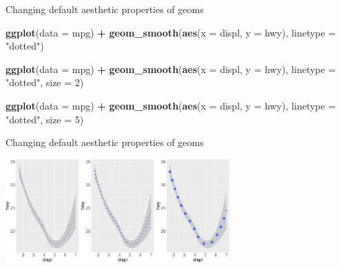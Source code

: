 \documentclass[ignorenonframetext,]{beamer}
\newenvironment{Shaded}{\begin{snugshade}}{\end{snugshade}}
\newcommand{\DataTypeTok}[1]{\textcolor[rgb]{0.13,0.29,0.53}{#1}}
\newcommand{\DecValTok}[1]{\textcolor[rgb]{0.00,0.00,0.81}{#1}}
\newcommand{\KeywordTok}[1]{\textcolor[rgb]{0.13,0.29,0.53}{\textbf{#1}}}
\newcommand{\NormalTok}[1]{#1}
\newcommand{\OperatorTok}[1]{\textcolor[rgb]{0.81,0.36,0.00}{\textbf{#1}}}
\newcommand{\StringTok}[1]{\textcolor[rgb]{0.31,0.60,0.02}{#1}}
\begin{document}
\begin{frame}[fragile]{Changing default aesthetic properties of geoms}
\protect\hypertarget{changing-default-aesthetic-properties-of-geoms-23}{}

\begin{Shaded}
\begin{Highlighting}[]
\KeywordTok{ggplot}\NormalTok{(}\DataTypeTok{data =}\NormalTok{ mpg) }\OperatorTok{+}\StringTok{ }
\StringTok{  }\KeywordTok{geom_smooth}\NormalTok{(}\KeywordTok{aes}\NormalTok{(}\DataTypeTok{x =}\NormalTok{ displ, }\DataTypeTok{y =}\NormalTok{ hwy),}
              \DataTypeTok{linetype =} \StringTok{"dotted"}\NormalTok{)}

\KeywordTok{ggplot}\NormalTok{(}\DataTypeTok{data =}\NormalTok{ mpg) }\OperatorTok{+}\StringTok{ }
\StringTok{  }\KeywordTok{geom_smooth}\NormalTok{(}\KeywordTok{aes}\NormalTok{(}\DataTypeTok{x =}\NormalTok{ displ, }\DataTypeTok{y =}\NormalTok{ hwy),}
              \DataTypeTok{linetype =} \StringTok{"dotted"}\NormalTok{, }\DataTypeTok{size =} \DecValTok{2}\NormalTok{)}

\KeywordTok{ggplot}\NormalTok{(}\DataTypeTok{data =}\NormalTok{ mpg) }\OperatorTok{+}\StringTok{ }
\StringTok{  }\KeywordTok{geom_smooth}\NormalTok{(}\KeywordTok{aes}\NormalTok{(}\DataTypeTok{x =}\NormalTok{ displ, }\DataTypeTok{y =}\NormalTok{ hwy),}
              \DataTypeTok{linetype =} \StringTok{"dotted"}\NormalTok{, }\DataTypeTok{size =} \DecValTok{5}\NormalTok{)}
\end{Highlighting}
\end{Shaded}

\end{frame}

\begin{frame}{Changing default aesthetic properties of geoms}
\protect\hypertarget{changing-default-aesthetic-properties-of-geoms-24}{}

\begin{center}\includegraphics[height=150px]{data-visualization_files/figure-beamer/unnamed-chunk-57-1} \end{center}

\end{frame}
\end{document}
